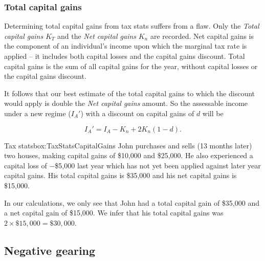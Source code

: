 \documentclass{grattan}\usepackage[]{graphicx}\usepackage[]{color}
\begin{document}
\subsubsection{Total capital gains}
Determining total capital gains from tax stats suffers from a flaw. Only the \emph{Total capital gains} $K_T$ and the \emph{Net capital gains} $K_n$ are recorded. Net capital gains is the component of an individual's income upon which the marginal tax rate is applied -- it includes both capital losses and the capital gains discount. Total capital gains is the sum of all capital gains for the year, without capital losses or the capital gains discount.

It follows that our best estimate of the total capital gains to which the discount would apply is double the \emph{Net capital gains} amount. So the assessable income under a new regime ($I_A'$) with a discount on capital gains of $d$ will be 

\[I_A' = I_A - K_n + 2K_n(1 - d).\]

\begin{smallbox}{Tax stats}{box:TaxStatsCapitalGains}
John purchases and sells (13 months later) two houses, making capital gains of \$10,000 and \$25,000. He also experienced a capital loss of $-$\$5,000 last year which has not yet been applied against later year capital gains. His total capital gains is \$35,000 and his net capital gains is \$15,000.

In our calculations, we only see that John had a total capital gain of \$35,000 and a net capital gain of \$15,000. We infer that his total capital gains was $2\times \$15,000 = \$30,000$. 
\end{smallbox}






\subsection{Negative gearing}
\end{document}
